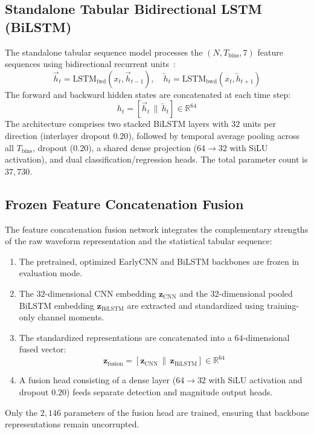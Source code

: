 \documentclass[journal]{IEEEtran}
\begin{document}
\subsection{Standalone Tabular Bidirectional LSTM (BiLSTM)}
The standalone tabular sequence model processes the $(N, T_{\text{bins}}, 7)$ feature sequences using bidirectional recurrent units~\cite{hochreiter1997long, schuster1997bidirectional}:
\begin{equation}
\vec{h}_t = \text{LSTM}_{\text{fwd}}(x_t, \vec{h}_{t-1}), \quad \overleftarrow{h}_t = \text{LSTM}_{\text{bwd}}(x_t, \overleftarrow{h}_{t+1})
\label{eq:bilstm_cells}
\end{equation}
The forward and backward hidden states are concatenated at each time step:
\begin{equation}
h_t = [\vec{h}_t \,\|\, \overleftarrow{h}_t] \in \mathbb{R}^{64}
\label{eq:bilstm_state}
\end{equation}
The architecture comprises two stacked BiLSTM layers with $32$ units per direction (interlayer dropout $0.20$), followed by temporal average pooling across all $T_{\text{bins}}$, dropout ($0.20$), a shared dense projection ($64 \to 32$ with SiLU activation), and dual classification/regression heads. The total parameter count is $37,730$.

\subsection{Frozen Feature Concatenation Fusion}
The feature concatenation fusion network integrates the complementary strengths of the raw waveform representation and the statistical tabular sequence:
\begin{enumerate}
    \item The pretrained, optimized EarlyCNN and BiLSTM backbones are frozen in evaluation mode.
    \item The $32$-dimensional CNN embedding $\mathbf{z}_{\text{CNN}}$ and the $32$-dimensional pooled BiLSTM embedding $\mathbf{z}_{\text{BiLSTM}}$ are extracted and standardized using training-only channel moments.
    \item The standardized representations are concatenated into a $64$-dimensional fused vector:
    \begin{equation}
    \mathbf{z}_{\text{fusion}} = [\mathbf{z}_{\text{CNN}} \,\|\, \mathbf{z}_{\text{BiLSTM}}] \in \mathbb{R}^{64}
    \label{eq:fusion_concat}
    \end{equation}
    \item A fusion head consisting of a dense layer ($64 \to 32$ with SiLU activation and dropout $0.20$) feeds separate detection and magnitude output heads.
\end{enumerate}
Only the $2,146$ parameters of the fusion head are trained, ensuring that backbone representations remain uncorrupted.
\end{document}
